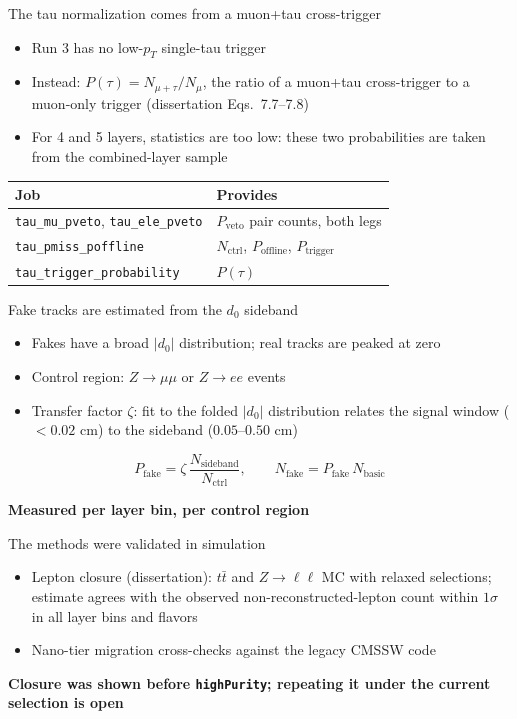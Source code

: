 \documentclass[aspectratio=169,12pt]{beamer}
\newcommand{\takeaway}[1]{\par\vspace{10pt}\centering\small\textbf{#1}\par}
\begin{document}
\begin{frame}{The tau normalization comes from a muon+tau cross-trigger}
  \begin{itemize}
    \item Run 3 has no low-$p_T$ single-tau trigger
    \item Instead: $P(\tau) = N_{\mu+\tau} / N_{\mu}$, the ratio of a muon+tau
          cross-trigger to a muon-only trigger (dissertation Eqs.~7.7--7.8)
    \item For 4 and 5 layers, statistics are too low: these two probabilities are
          taken from the combined-layer sample
  \end{itemize}
  \centering\small\renewcommand{\arraystretch}{0.9}
  \begin{tabular}{p{}p{}}
    \toprule
    Job & Provides \\
    \midrule
    \texttt{tau\_mu\_pveto}, \texttt{tau\_ele\_pveto} & $P_{\mathrm{veto}}$ pair counts, both legs \\
    \texttt{tau\_pmiss\_poffline} & $N_{\mathrm{ctrl}}$, $P_{\mathrm{offline}}$, $P_{\mathrm{trigger}}$ \\
    \texttt{tau\_trigger\_probability} & $P(\tau)$ \\
    \bottomrule
  \end{tabular}
\end{frame}

\begin{frame}{Fake tracks are estimated from the $d_0$ sideband}
  \begin{itemize}
    \item Fakes have a broad $|d_0|$ distribution; real tracks are peaked at zero
    \item Control region: $Z\to\mu\mu$ or $Z\to ee$ events
    \item Transfer factor $\zeta$: fit to the folded $|d_0|$ distribution relates the
          signal window ($<0.02$ cm) to the sideband ($0.05$--$0.50$ cm)
  \end{itemize}
  \[
    P_{\mathrm{fake}} = \zeta \, \frac{N_{\mathrm{sideband}}}{N_{\mathrm{ctrl}}},
    \qquad N_{\mathrm{fake}} = P_{\mathrm{fake}} \, N_{\mathrm{basic}}
  \]
  \takeaway{Measured per layer bin, per control region}
\end{frame}

\begin{frame}{The methods were validated in simulation}
  \begin{itemize}
    \item Lepton closure (dissertation): $t\bar t$ and $Z\to\ell\ell$ MC with relaxed
          selections; estimate agrees with the observed non-reconstructed-lepton
          count within $1\sigma$ in all layer bins and flavors
    \item Nano-tier migration cross-checks against the legacy CMSSW code
  \end{itemize}
  \takeaway{Closure was shown before \texttt{highPurity}; repeating it under the current selection is open}
\end{frame}
\end{document}
